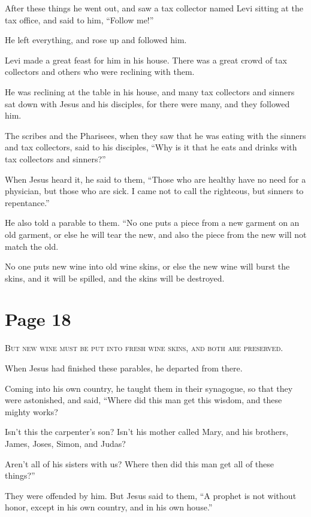 After these things he went out, and saw a tax collector named Levi sitting at the tax office, and said to him, “Follow me!”

He left everything, and rose up and followed him.

Levi made a great feast for him in his house. There was a great crowd of tax collectors and others who were reclining with them.

He was reclining at the table in his house, and many tax collectors and sinners sat down with Jesus and his disciples, for there were many, and they followed him.

The scribes and the Pharisees, when they saw that he was eating with the sinners and tax collectors, said to his disciples, “Why is it that he eats and drinks with tax collectors and sinners?”

When Jesus heard it, he said to them, “Those who are healthy have no need for a physician, but those who are sick. I came not to call the righteous, but sinners to repentance.”

He also told a parable to them. “No one puts a piece from a new garment on an old garment, or else he will tear the new, and also the piece from the new will not match the old.

No one puts new wine into old wine skins, or else the new wine will burst the skins, and it will be spilled, and the skins will be destroyed.



\chapterornament
\section*{Page 18}

\lettrine{B}{ut new wine must be put into fresh wine skins, and both are preserved.}

When Jesus had finished these parables, he departed from there.

Coming into his own country, he taught them in their synagogue, so that they were astonished, and said, “Where did this man get this wisdom, and these mighty works?

Isn’t this the carpenter’s son? Isn’t his mother called Mary, and his brothers, James, Joses, Simon, and Judas?

Aren’t all of his sisters with us? Where then did this man get all of these things?”

They were offended by him. But Jesus said to them, “A prophet is not without honor, except in his own country, and in his own house.”


